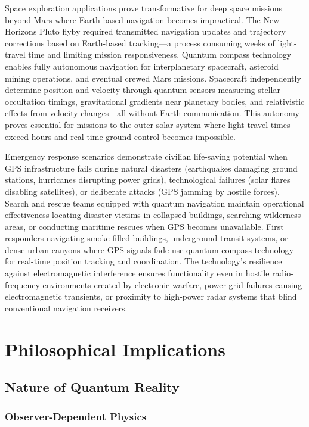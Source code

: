 \documentclass[11pt,a4paper,twoside]{article}
\begin{document}
Space exploration applications prove transformative for deep space missions beyond Mars where Earth-based navigation becomes impractical. The New Horizons Pluto flyby required transmitted navigation updates and trajectory corrections based on Earth-based tracking---a process consuming weeks of light-travel time and limiting mission responsiveness. Quantum compass technology enables fully autonomous navigation for interplanetary spacecraft, asteroid mining operations, and eventual crewed Mars missions. Spacecraft independently determine position and velocity through quantum sensors measuring stellar occultation timings, gravitational gradients near planetary bodies, and relativistic effects from velocity changes---all without Earth communication. This autonomy proves essential for missions to the outer solar system where light-travel times exceed hours and real-time ground control becomes impossible.

Emergency response scenarios demonstrate civilian life-saving potential when GPS infrastructure fails during natural disasters (earthquakes damaging ground stations, hurricanes disrupting power grids), technological failures (solar flares disabling satellites), or deliberate attacks (GPS jamming by hostile forces). Search and rescue teams equipped with quantum navigation maintain operational effectiveness locating disaster victims in collapsed buildings, searching wilderness areas, or conducting maritime rescues when GPS becomes unavailable. First responders navigating smoke-filled buildings, underground transit systems, or dense urban canyons where GPS signals fade use quantum compass technology for real-time position tracking and coordination. The technology's resilience against electromagnetic interference ensures functionality even in hostile radio-frequency environments created by electronic warfare, power grid failures causing electromagnetic transients, or proximity to high-power radar systems that blind conventional navigation receivers.

\section{Philosophical Implications}

\subsection{Nature of Quantum Reality}

\subsubsection{Observer-Dependent Physics}
\end{document}
